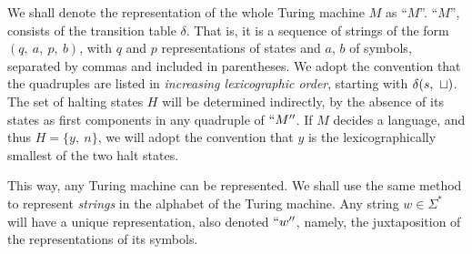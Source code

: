 We shall denote the representation of the whole Turing machine $M$ as ``$M$''. ``$M$'', consists of the transition table $\delta$. That is, it is a sequence of strings of the form $(q,\ a,\ p,\ b)$, with $q$ and $p$ representations of states and $a$, $b$ of symbols, separated by commas and included in parentheses. We adopt the convention that the quadruples are listed in \textit{increasing lexicographic order}, starting with $\delta(s,\ \sqcup)$. The set of halting states $H$ will be determined indirectly, by the absence of its states as first components in any quadruple of $``M''$. If $M$ decides a language, and thus $H = \{ y,\ n \}$, we will adopt the convention that $y$ is the lexicographically smallest of the two halt states.

This way, any Turing machine can be represented. We shall use the same method to represent \textit{strings} in the alphabet of the Turing machine. Any string $w \in \Sigma^*$ will have a unique representation, also denoted $``w''$, namely, the juxtaposition of the representations of its symbols.

\vspace*{\fill}
\columnbreak


